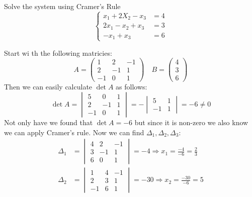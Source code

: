 \begin{example}{Solve the system using Cramer's Rule}{}
    \[\begin{cases}
        x_1 + 2X_2 - x_3 &= 4 \\
        2x_1 - x_2 + x_3 &= 3 \\
        -x_1 + x_3 &= 6
    \end{cases}\]
    \begin{solution}
        Start wi th the following matricies: 
        \[A = \begin{pmatrix}
            1 & 2 & -1 \\
            2 & -1 & 1 \\
            -1 & 0 & 1
        \end{pmatrix}
        \quad 
        B = \begin{pmatrix}
            4 \\ 3 \\ 6
        \end{pmatrix}\]
        Then we can easily calculate $\det{A}$ as follows:
        \[\det{A} = \begin{vmatrix}
            5 & 0 & 1 \\
            2 & -1 & 1 \\
            -1 & 0 & 1
        \end{vmatrix} = -\begin{vmatrix}
            5 & 1 \\ -1 & 1
        \end{vmatrix} = -6 \neq 0\]
        Not only have we found that $\det{A}=-6$ but since it is non-zero we also know we can apply Cramer's rule. Now we can find $\Delta_1, \Delta_2, \Delta_3$:
        \begin{align*}
            \Delta_1 &= \begin{vmatrix}
                4 & 2 & -1 \\
                3 & -1 & 1 \\
                6 & 0 & 1
            \end{vmatrix}
            = -4 \Rightarrow x_1 = \frac{-4}{-6} = \frac{2}{3} \\
            \Delta_2 &= \begin{vmatrix}
                1 & 4 & -1 \\
                2 & 3 & 1 \\
                -1 & 6 & 1
            \end{vmatrix}
            = -30 \Rightarrow x_2 = \frac{-30}{-6} = 5 \\

\end{align*}
\end{solution}
\end{example}
